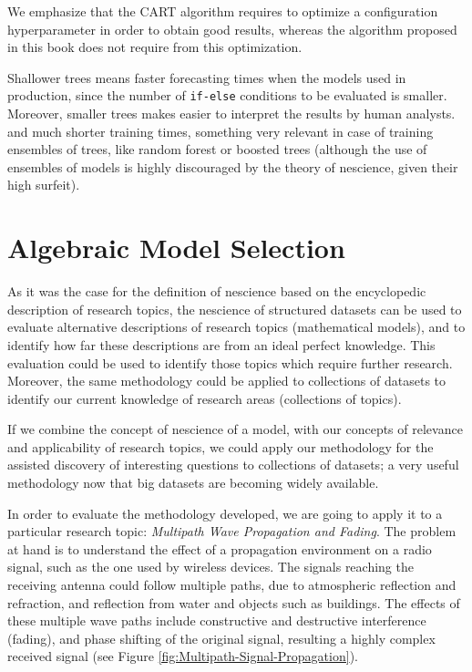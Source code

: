 We emphasize that the CART algorithm requires to optimize a configuration hyperparameter in order to obtain good results, whereas the algorithm proposed in this book does not require from this optimization.

Shallower trees means faster forecasting times when the models used in production, since the number of \texttt{if-else} conditions to be evaluated is smaller. Moreover, smaller trees makes easier to interpret the results by human analysts. and much shorter training times, something very relevant in case of training ensembles of trees, like random forest or boosted trees (although the use of ensembles of models is highly discouraged by the theory of nescience, given their high surfeit).

%
%

\section{Algebraic Model Selection}

As it was the case for the definition of nescience based on the encyclopedic description of research topics, the nescience of structured datasets can be used to evaluate alternative descriptions of research topics (mathematical models), and to identify how far these descriptions are from an ideal perfect knowledge. This evaluation could be used to identify those topics which require further research. Moreover, the same methodology could be applied to collections of datasets to identify our current knowledge of research areas (collections of topics).

If we combine the concept of nescience of a model, with our concepts of relevance and applicability of research topics, we could apply our methodology for the assisted discovery of interesting questions to collections of datasets; a very useful methodology now that big datasets are becoming widely available.

In order to evaluate the methodology developed, we are going to apply it to a particular research topic: \emph{Multipath Wave Propagation and Fading}. The problem at hand is to understand the effect of a propagation environment on a radio signal, such as the one used by wireless devices. The signals reaching the receiving antenna could follow multiple paths, due to atmospheric reflection and refraction, and reflection from water and objects such as buildings. The effects of these multiple wave paths include constructive and destructive interference (fading), and phase shifting of the original signal, resulting a highly complex received signal (see Figure \ref{fig:Multipath-Signal-Propagation}).

